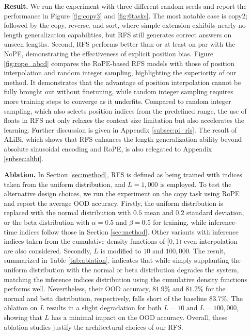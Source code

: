 \documentclass[11pt]{article}
\begin{document}
\noindent\textbf{Result.} We run the experiment with three different random seeds and report the performance in Figure \ref{fig:copy3} and \ref{fig:6tasks}. The most notable case is copy2; followed by the copy, reverse, and sort, where simple extension exhibits nearly no length generalization capabilities, but RFS still generates correct answers on unseen lengths. Second, RFS performs better than or at least on par with the NoPE, demonstrating the effectiveness of explicit position bias. Figure \ref{fig:rope_abcd} compares the RoPE-based RFS models with those of position interpolation and random integer sampling, highlighting the superiority of our method. It demonstrates that the advantage of position interpolation cannot be fully brought out without finetuning, while random integer sampling requires more training steps to converge as it underfits. Compared to random integer sampling, which also selects position indices from the predefined range, the use of floats in RFS not only relaxes the context size limitation but also accelerates the learning. Further discussion is given in Appendix \ref{subsec:pi_ris}. The result of ALiBi, which shows that RFS enhances the length generalization ability beyond absolute sinusoidal encoding and RoPE, is also relegated to Appendix \ref{subsec:alibi}.

\noindent\textbf{Ablation.} In Section \ref{sec:method}, RFS is defined as being trained with indices taken from the uniform distribution, and $L=1,000$ is employed. To test the alternative design choices, we run the experiment on the copy task using RoPE and report the average OOD accuracy. Firstly, the uniform distribution is replaced with the normal distribution with $0.5$ mean and $0.2$ standard deviation, or the beta distribution with $\alpha=0.5$ and $\beta=0.5$ for training, while inference-time indices follow those in Section \ref{sec:method}. Other variants with inference indices taken from the cumulative density functions of $[0, 1)$ even interpolation are also considered. Secondly, $L$ is modified to $10$ and $100,000$. The result, summarized in Table \ref{tab:ablation}, indicates that while simply supplanting the uniform distribution with the normal or beta distribution degrades the system, matching the inference indices distribution using the cumulative density functions performs well. Nevertheless, their OOD accuracy, $81.9\%$ and $81.2\%$ for the normal and beta distribution, respectively, falls short of the baseline $83.7\%$. The ablation on $L$ results in a slight degradation for both $L=10$ and $L=100,000$, showing that $L$ has a minimal impact on the OOD accuracy. Overall, these ablation studies justify the architectural choices of our RFS.
\end{document}
